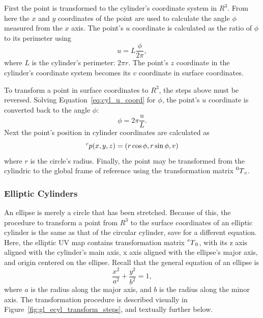 First the point is transformed to the cylinder's coordinate system in $R^3$.
From here the $x$ and $y$ coordinates of the point are used to calculate the angle $\phi$ measured from the $x$ axis.
The point's $u$ coordinate is calculated as the ratio of $\phi$ to its perimeter using
\begin{equation}\label{eq:cyl_u_coord}
	u = L \frac{\phi}{2\pi},
\end{equation}
where $L$ is the cylinder's perimeter: $2\pi r$.
The point's $z$ coordinate in the cylinder's coordinate system becomes its $v$ coordinate in surface coordinates.

To transform a point in surface coordinates to $R^3$, the steps above must be reversed.
Solving Equation~\eqref{eq:cyl_u_coord} for $\phi$, the point's $u$ coordinate is converted back to the angle $\phi$:
\begin{equation*}
	\phi = 2\pi \frac{u}{L}.
\end{equation*}
Next the point's position in cylinder coordinates are calculated as
\begin{equation*}
	\prescript{c}{}p(x,y,z) = (r \cos \phi, r \sin \phi, v)
\end{equation*}
where $r$ is the circle's radius.
Finally, the point may be transformed from the cylindric to the global frame of reference using the transformation matrix $\prescript{0}{}T_c$.

\subsubsection{Elliptic Cylinders}
An ellipse is merely a circle that has been stretched.
Because of this, the procedure to transform a point from $R^3$ to the surface coordinates of an elliptic cylinder is the same as that of the circular cylinder, save for a different equation.
Here, the elliptic UV map contains transformation matrix $\prescript{e}{}T_0$, with its z axis aligned with the cylinder's main axis, x axis aligned with the ellipse's major axis, and origin centered on the ellipse.
Recall that the general equation of an ellipse is
\begin{equation*}
	\frac{x^2}{a^2} + \frac{y^2}{b^2} = 1,
\end{equation*}
where $a$ is the radius along the major axis, and $b$ is the radius along the minor axis.
The transformation procedure is described visually in Figure~\ref{fig:gl_ecyl_transform_steps}, and textually further below.

